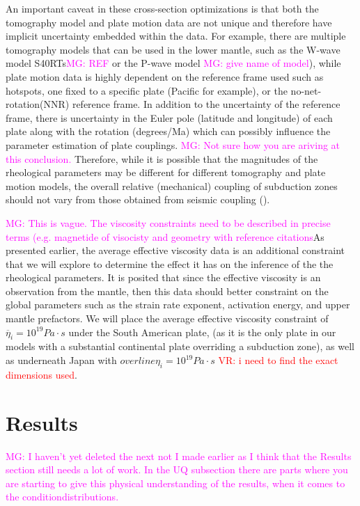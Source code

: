 \documentclass[12pt]{article}
\newcommand{\mgnote}[1]{\textcolor{magenta}{MG: #1}}
\newcommand{\vrnote}[1]{\textcolor{red}{VR: #1}}
\begin{document}
An important caveat in these cross-section optimizations is that both the tomography model and plate motion data are not unique and therefore have implicit uncertainty embedded within the data. For example, there are multiple tomography models that can be used in the lower mantle, such as the W-wave model S40RTs\mgnote{REF} or the P-wave model \mgnote{give name of model}\citep{simmons2012llnl}), while plate motion data is highly dependent on the reference frame used such as hotspots, one fixed to a specific plate (Pacific for example), or the no-net-rotation(NNR) reference frame. In addition to the uncertainty of the reference frame, there is uncertainty in the Euler pole (latitude and longitude) of each plate along with the rotation (degrees/Ma) which can possibly influence the parameter estimation of plate couplings. \mgnote{Not sure how you are ariving at this conclusion.} Therefore, while it is possible that the magnitudes of the rheological parameters may be different for different tomography and plate motion models, the overall relative (mechanical) coupling of subduction zones should not vary from those obtained from seismic coupling (\citep{scholz2012seismic}).


\mgnote{This is vague. The viscosity constraints need to be described in precise terms (e.g. magnetide of visocisty and geometry with reference citations}As presented earlier, the average effective viscosity data is an additional constraint that we will explore to determine the effect it has on the inference of the the rheological parameters. It is posited that since the effective viscosity is an observation from the mantle, then this data should better constraint on the global parameters such as the strain rate exponent, activation energy, and upper mantle prefactors. We will place the average effective viscosity constraint of $\overline{\eta}_i = 10^{19} Pa\cdot s$ under the South American plate, (as it is the only plate in our models with a substantial continental plate overriding a subduction zone), as well as underneath Japan with $overline{\eta}_i = 10^{19} Pa\cdot s$ \citep{hu2016asthenosphere} \vrnote{i need to find the exact dimensions used}.

\section{Results}

\mgnote{I haven't yet deleted the next not I made earlier as I think that the Results section still needs a lot of work. In the UQ subsection there are parts where you are starting to give this physical understanding of the results, when it comes to the conditiondistributions.}
\end{document}
